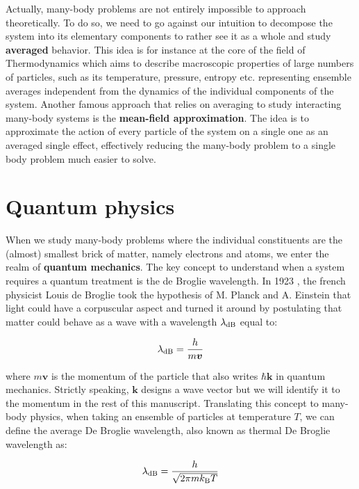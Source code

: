 Actually, many-body problems are not entirely impossible to approach theoretically. To do so, we need to go against our intuition to decompose the system into its elementary components to rather see it as a whole and study \textbf{averaged} behavior. This idea is for instance at the core of the field of Thermodynamics which aims to describe macroscopic properties of large numbers of particles, such as its temperature, pressure, entropy etc. representing ensemble averages independent from the dynamics of the individual components of the system. Another famous approach that relies on averaging to study interacting many-body systems is the \textbf{mean-field approximation}. The idea is to approximate the action of every particle of the system on a single one as an averaged single effect, effectively reducing the many-body problem to a single body problem much easier to solve.

\section*{Quantum physics}

When we study many-body problems where the individual constituents are the (almost) smallest brick of matter, namely electrons and atoms, we enter the realm of \textbf{quantum mechanics}. The key concept to understand when a system requires a quantum treatment is the de Broglie wavelength. In 1923 \cite{debroglie:tel-00006807}, the french physicist Louis de Broglie took the hypothesis of M. Planck and A. Einstein that light could have a corpuscular aspect and turned it around by postulating that matter could behave as a wave with a wavelength $\lambda_{\rm{dB}}$ equal to:

\begin{equation}
    \lambda_{\rm{dB}} = \frac{h}{m\bm{v}}
\end{equation}

\noindent where $m\bm{v}$ is the momentum of the particle that also writes $\hbar \bm{k}$ in quantum mechanics. Strictly speaking, $\bm{k}$ designs a wave vector but we will identify it to the momentum in the rest of this manuscript. Translating this concept to many-body physics, when taking an ensemble of particles at temperature $T$, we can define the average De Broglie wavelength, also known as thermal De Broglie wavelength as:

\begin{equation}
    \lambda_{\rm{dB}} = \frac{h}{\sqrt{2 \pi m k_{\mathrm{B}} T}}
\end{equation}

